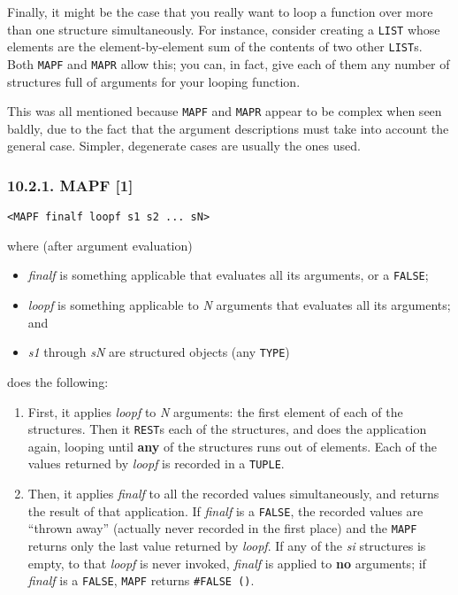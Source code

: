 \documentclass[a4paper,]{article}
\providecommand{\tightlist}{%
  \setlength{\itemsep}{0pt}\setlength{\parskip}{0pt}}
\begin{document}
Finally, it might be the case that you really want to loop a function over more than one structure simultaneously. For
instance, consider creating a \texttt{LIST} whose elements are the element-by-element sum of the contents of two other
\texttt{LIST}s. Both \texttt{MAPF} and \texttt{MAPR} allow this; you can, in fact, give each of them any number of
structures full of arguments for your looping function.

This was all mentioned because \texttt{MAPF} and \texttt{MAPR} appear to be complex when seen baldly, due to the fact that
the argument descriptions must take into account the general case. Simpler, degenerate cases are usually the ones used.

\subsubsection{10.2.1. MAPF {[}1{]}}\label{mapf-1}

\begin{verbatim}
<MAPF finalf loopf s1 s2 ... sN>
\end{verbatim}

 where (after argument evaluation)

\begin{itemize}
\tightlist
\item
  \emph{finalf} is something applicable that evaluates all its arguments, or a \texttt{FALSE};
\item
  \emph{loopf} is something applicable to \emph{N} arguments that evaluates all its arguments; and
\item
  \emph{s1} through \emph{sN} are structured objects (any \texttt{TYPE})
\end{itemize}

does the following:

\begin{enumerate}
\def\labelenumi{\arabic{enumi}.}
\tightlist
\item
  First, it applies \emph{loopf} to \emph{N} arguments: the first element of each of the structures. Then it \texttt{REST}s
  each of the structures, and does the application again, looping until \textbf{any} of the structures runs out of
  elements. Each of the values returned by \emph{loopf} is recorded in a \texttt{TUPLE}.
\item
  Then, it applies \emph{finalf} to all the recorded values simultaneously, and returns the result of that application. If
  \emph{finalf} is a \texttt{FALSE}, the recorded values are ``thrown away'' (actually never recorded in the first place)
  and the \texttt{MAPF} returns only the last value returned by \emph{loopf}. If any of the \emph{si} structures is empty,
  to that \emph{loopf} is never invoked, \emph{finalf} is applied to \textbf{no} arguments; if \emph{finalf} is a
  \texttt{FALSE}, \texttt{MAPF} returns \texttt{\#FALSE\ ()}.
\end{enumerate}
\end{document}
